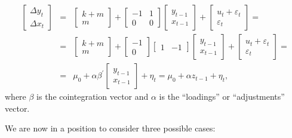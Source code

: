 \begin{eqnarray*}
  \left[  \begin{array}{c} \Delta y_t \\ \Delta x_t \end{array} \right]  & = & 
  \left[  \begin{array}{c} k + m \\ m \end{array} \right] +
  \left[  \begin{array}{rr} -1 & 1 \\ 0 & 0 \end{array} \right] 
  \left[  \begin{array}{c} y_{t-1} \\ x_{t-1} \end{array} \right] + 
  \left[  \begin{array}{c} u_t + \varepsilon_t \\ \varepsilon_t \end{array} \right] = \\
  & = & 
  \left[  \begin{array}{c} k + m \\ m \end{array} \right] +
  \left[  \begin{array}{r} -1 \\ 0 \end{array} \right]
  \left[  \begin{array}{rr} 1 & -1 \end{array} \right] 
  \left[  \begin{array}{c} y_{t-1} \\ x_{t-1} \end{array} \right] + 
  \left[  \begin{array}{c} u_t + \varepsilon_t \\ \varepsilon_t \end{array} \right] = \\
  & = & 
  \mu_0 + \alpha \beta^{\prime} \left[  \begin{array}{c} y_{t-1} \\ x_{t-1} \end{array} \right] + \eta_t = 
  \mu_0 + \alpha z_{t-1} + \eta_t ,
\end{eqnarray*}
%	
where $\beta$ is the cointegration vector and $\alpha$ is the
``loadings'' or ``adjustments'' vector.
     
We are now in a position to consider three possible cases:
    
